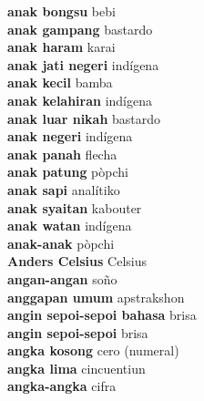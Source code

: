 \textbf{ anak bongsu  } bebi \\
\textbf{ anak gampang  } bastardo \\
\textbf{ anak haram  } karai \\
\textbf{ anak jati negeri  } indígena \\
\textbf{ anak kecil  } bamba \\
\textbf{ anak kelahiran  } indígena \\
\textbf{ anak luar nikah  } bastardo \\
\textbf{ anak negeri  } indígena \\
\textbf{ anak panah  } flecha \\
\textbf{ anak patung  } pòpchi \\
\textbf{ anak sapi  } analítiko \\
\textbf{ anak syaitan  } kabouter \\
\textbf{ anak watan  } indígena \\
\textbf{ anak-anak  } pòpchi \\
\textbf{ Anders Celsius  } Celsius \\
\textbf{ angan-angan  } soño \\
\textbf{ anggapan umum  } apstrakshon \\
\textbf{ angin sepoi-sepoi bahasa  } brisa \\
\textbf{ angin sepoi-sepoi  } brisa \\
\textbf{ angka kosong  } cero (numeral) \\
\textbf{ angka lima  } cincuentiun \\
\textbf{ angka-angka  } cifra \\
